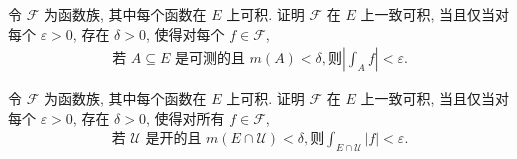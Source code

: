 \documentclass[../../main.tex]{subfiles}
\begin{document}
\begin{exercise}\label{exercise:ch04-50}
令 $\mathcal{F}$ 为函数族, 其中每个函数在 $E$ 上可积. 证明 $\mathcal{F}$ 在 $E$ 上一致可积, 当且仅当对每个 $\varepsilon>0$, 存在 $\delta>0$, 使得对每个 $f\in\mathcal{F}$,
\begin{align*}
\text{若 }A\subseteq E\text{ 是可测的且 }m(A)<\delta,\text{则}\left|\int_{A}f\right|<\varepsilon.
\end{align*}
\end{exercise}

\begin{exercise}\label{exercise:ch04-51}
令 $\mathcal{F}$ 为函数族, 其中每个函数在 $E$ 上可积. 证明 $\mathcal{F}$ 在 $E$ 上一致可积, 当且仅当对每个 $\varepsilon>0$, 存在 $\delta>0$, 使得对所有 $f\in\mathcal{F}$,
\begin{align*}
\text{若 }\mathcal{U}\text{ 是开的且 }m(E\cap\mathcal{U})<\delta,\text{则}\int_{E\cap\mathcal{U}}|f|<\varepsilon.
\end{align*}
\end{exercise}
\end{document}

